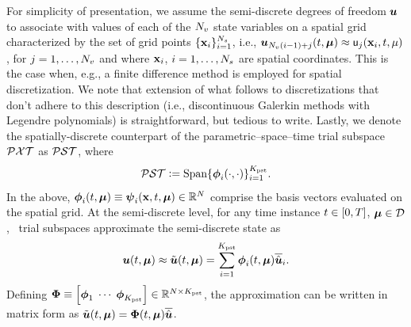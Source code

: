 \documentclass[3p,computermodern,10pt]{elsarticle}
\begin{document}
For simplicity of presentation, we assume the semi-discrete degrees of freedom $\boldsymbol u$ to associate with values of each of the $N_v$ state variables on a spatial grid characterized by the set of grid points $\{\mathbf{x}_i\}_{i=1}^{N_s}$, i.e., $\boldsymbol u_{N_v(i-1) + j}(t,\boldsymbol \mu) \approx \mathsf{u}_j(\mathbf{x}_i,t,\mu)$, for $j=1,\ldots,N_v$ and where $\mathbf{x}_i$, $i=1,\ldots,N_s$ are spatial coordinates. This is the case when, e.g., a finite difference method is employed for spatial discretization. We note that extension of what follows to discretizations that don't adhere to this description (i.e., discontinuous Galerkin methods with Legendre polynomials) is straightforward, but tedious to write. Lastly, we denote the spatially-discrete counterpart of the parametric--space--time trial subspace $\mathcal{PXT}$ as $\mathcal{PST}$, where
\begin{equation}\label{eq:psttrialspace_def}
 \mathcal{PST} \vcentcolon= 
        \text{Span}\{\boldsymbol \phi_i(\cdot,\cdot)\}_{i=1}^{K_{\text{pst}}}. 
\end{equation}
In the above, $\boldsymbol \phi_i(t,\boldsymbol \mu) \equiv \boldsymbol \psi_i(\mathbf{x},t,\boldsymbol \mu) \in \mathbb{R}^{N}$ comprise the basis vectors evaluated on the spatial grid. At the semi-discrete level, for any time instance $t \in [0,T]$, $\boldsymbol \mu \in \mathcal{D}$, \parametricSpaceTimeAcronym\ trial subspaces approximate the semi-discrete state as
$$\boldsymbol u(t,\boldsymbol \mu) \approx \tilde{\boldsymbol u}(t,\boldsymbol \mu) =\sum_{i=1}^{K_{\text{pst}}} \boldsymbol \phi_i(t,\boldsymbol \mu) \overline{\hat{\boldsymbol u}}_i.$$
Defining $\boldsymbol \Phi \equiv \left[ \boldsymbol \phi_1 \; \cdots \; \boldsymbol \phi_{K_{\text{pst}}} \right] \in \mathbb{R}^{N \times K_{\text{pst}}}$, the approximation can be written in matrix form as $\tilde{\boldsymbol u}(t,\boldsymbol \mu) =\boldsymbol \Phi(t,\boldsymbol \mu)  \overline{\hat{\boldsymbol u}}$. 
\end{document}
